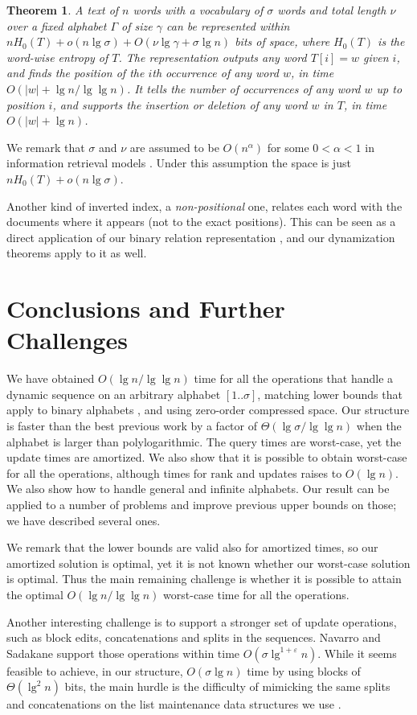 \documentclass[11pt]{article}
\def\idrm#1{\ensuremath{\mathrm{#1}}}
\newtheorem{theorem}{Theorem}
\newcommand{\ra}{\idrm{rank}}
\newcommand{\eps}{\varepsilon}
\begin{document}
\begin{theorem}
A text of $n$ words with a vocabulary of $\sigma$ words and total length $\nu$
over a fixed alphabet $\Gamma$ of size $\gamma$ can be represented 
within $nH_0(T) + o(n\lg\sigma) + O(\nu\lg\gamma+\sigma\lg n)$
bits of space, where $H_0(T)$ is
the word-wise entropy of $T$.
The representation outputs any word $T[i]=w$
given $i$, and finds the position of the $i$th occurrence of any word $w$,
in time $O(|w|+\lg n / \lg\lg n)$.
It tells the number of occurrences of any word $w$ up to position $i$, and
supports the insertion or deletion of any word $w$ in $T$, in time 
$O(|w|+\lg n)$.
\end{theorem}

We remark that $\sigma$ and $\nu$ are assumed to be $O(n^\alpha)$ for some 
$0<\alpha<1$ in information retrieval models \cite{BYRN11}. Under this
assumption the space is just $nH_0(T) + o(n\lg\sigma)$.

Another kind of inverted index, a {\em non-positional} one, relates each word
with the documents where it appears (not to the exact positions). This can be
seen as a direct application of our binary relation representation
\cite{BCN10}, and our dynamization theorems apply to it as well.

\section{Conclusions and Further Challenges} \label{sec:concl}

We have obtained $O(\lg n /\lg\lg n)$ time for all the operations that handle 
a dynamic sequence on an arbitrary alphabet $[1..\sigma]$, matching lower 
bounds that apply to binary alphabets \cite{FS89}, and using zero-order
compressed space. Our structure is faster than the best previous work 
\cite{HM10,NS10} by a factor of $\Theta(\lg\sigma/\lg\lg n)$ when the
alphabet is larger than polylogarithmic. 
The query times are worst-case, yet the update times are amortized. We also
show that it is possible to obtain worst-case for all the operations, although
times for $\ra$ and updates raises to $O(\lg n)$.
We also show how to handle general and infinite alphabets.
Our result can be applied to a number of problems and improve previous
upper bounds on those; we have described several ones.

We remark that the lower bounds \cite{FS89} are valid also for amortized times,
so our amortized solution is optimal, yet it is not known whether our
worst-case solution is optimal. Thus the main remaining challenge is whether 
it is possible to attain the optimal $O(\lg n / \lg\lg n)$ worst-case time 
for all the operations. 

Another interesting challenge is to support a stronger set of update 
operations, such as block edits, concatenations and splits in the sequences.
Navarro and Sadakane \cite{NS10} support those operations within time
$O(\sigma\lg^{1+\eps} n)$. While it seems feasible to achieve, in our 
structure, $O(\sigma\lg n)$ time by using blocks of $\Theta(\lg^2 n)$ bits,
the main hurdle is the difficulty of mimicking the same splits and
concatenations on the list maintenance data structures we use 
\cite{IA84,Mor03}.




\end{document}
